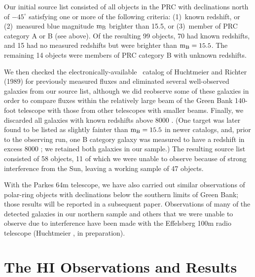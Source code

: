 Our initial source list consisted of all objects in the PRC with
declinations north of $-45^\circ$ satisfying one or more of the following
criteria:  (1)~known redshift, or (2)~measured blue magnitude $\rm m_B$ 
brighter than 15.5, or (3)~member of PRC category A or B (see above).  
Of the resulting 99 objects, 70 had known redshifts, and 15 had no
measured redshifts but were brighter than $\rm{m_B = 15.5}$.  The
remaining 14 objects were members of PRC category B with unknown
redshifts.

We then checked the electronically-available \HI\ catalog of Huchtmeier and
Richter (1989) 
for previously measured fluxes and 
eliminated several well-observed galaxies from our source list, although 
we did reobserve some of these galaxies in order  
to compare fluxes within the relatively large beam of the Green Bank 140-foot  
telescope with those from other telescopes with smaller beams.  Finally, 
we discarded all galaxies with known redshifts above 8000 \KMS. 
(One target was later found to be listed as slightly fainter than 
$\rm m_B = 15.5$ in newer catalogs, and, prior to the observing run, one 
B category galaxy was measured to have a redshift in excess 8000 \KMS; 
we retained both galaxies in our sample.)   
The resulting source list consisted of 58 objects, 11 of which we were 
unable to observe because of strong interference from the Sun, leaving a 
working sample of 47 objects.

With the Parkes 64m telescope, we have also carried out similar
observations of polar-ring objects with declinations below the southern
limits of Green Bank; those results will be reported in a subsequent
paper.  
Observations of many of the detected galaxies in our northern sample and 
others that we were unable to observe due to interference have been made  
with the Effelsberg 100m radio telescope (Huchtmeier \etal, in preparation). 

\vspace*{.2in}

\section{The HI Observations and Results}
\medskip

